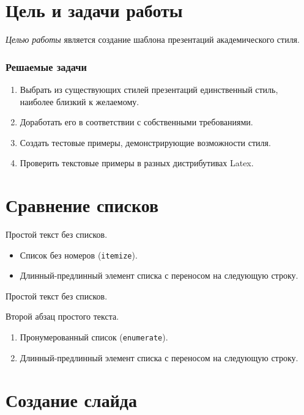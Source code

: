 \documentclass[12pt]{article}
\begin{document}

\TitleSlide


\section{Цель и задачи работы}

\emph{Целью работы} является создание шаблона презентаций академического стиля.

\subsubsection{Решаемые задачи}

\begin{enumerate}
\item Выбрать из существующих стилей презентаций единственный стиль, наиболее близкий к желаемому.
\item Доработать его в соответствии с собственными требованиями.
\item Создать тестовые примеры, демонстрирующие возможности стиля.
\item Проверить текстовые примеры в разных дистрибутивах Latex.
\end{enumerate}

\section{Сравнение списков}

Простой текст без списков.

\begin{itemize}
\item Список без номеров (\verb+itemize+).
\item Длинный-предлинный элемент списка с переносом на следующую строку.
\end{itemize}

Простой текст без списков.

Второй абзац простого текста.

\begin{enumerate}
\item Пронумерованный список (\verb+enumerate+).
\item Длинный-предлинный элемент списка с переносом на следующую строку.
\end{enumerate}

\section{Создание слайда}
\end{document}
